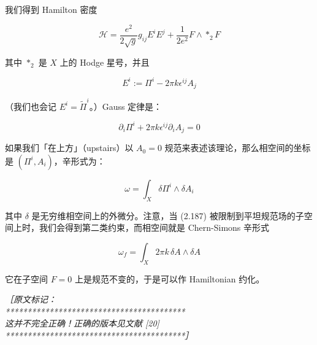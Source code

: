 我们得到 Hamilton 密度

\begin{equation}
  \mathcal{H}=\frac{e^2}{2\sqrt{g}}g_{ij}E^iE^j+\frac{1}{2e^2}F\wedge *_2F
  \tag{2.184}
  \label{eq:2.184}
\end{equation}

其中 $*_2$ 是 $X$ 上的 Hodge 星号，并且

\begin{equation}
  E^i:=\Pi^i-2\pi k\epsilon^{ij}A_j
  \tag{2.185}
  \label{eq:2.185}
\end{equation}

（我们也会记 $E^i=\tilde\Pi^i$。）Gauss 定律是：

\begin{equation}
  \partial_i\Pi^i+2\pi k\epsilon^{ij}\partial_iA_j=0
  \tag{2.186}
  \label{eq:2.186}
\end{equation}

如果我们「在上方」（upstairs）以 $A_0=0$ 规范来表述该理论，那么相空间的坐标是 $(\Pi^i,A_i)$，辛形式为：

\begin{equation}
  \omega=\int_X\delta\Pi^i\wedge\delta A_i
  \tag{2.187}
  \label{eq:2.187}
\end{equation}

其中 $\delta$ 是无穷维相空间上的外微分。注意，当 (2.187) 被限制到平坦规范场的子空间上时，我们会得到第二类约束，而相空间就是 Chern-Simons 辛形式

\begin{equation}
  \omega_f=\int_X2\pi k\,\delta A\wedge\delta A
  \tag{2.188}
  \label{eq:2.188}
\end{equation}

它在子空间 $F=0$ 上是规范不变的，于是可以作 Hamiltonian 约化。

{\small\itshape
［原文标记：\\
*****************************************\\
这并不完全正确！正确的版本见文献 [20]\\
*****************************************］}

